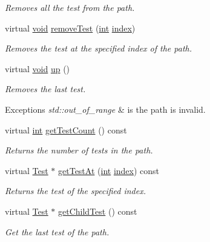 \begin{DoxyCompactItemize}
\begin{DoxyCompactList}\small\item\em Removes all the test from the path. \end{DoxyCompactList}\item 
virtual \hyperlink{wglew_8h_aeea6e3dfae3acf232096f57d2d57f084}{void} \hyperlink{class_test_path_afd1769a314ef84b6cbdd01af35009a0e}{remove\-Test} (\hyperlink{wglew_8h_a500a82aecba06f4550f6849b8099ca21}{int} \hyperlink{fmod__codec_8h_a57f14e05b1900f16a2da82ade47d0c6d}{index})
\begin{DoxyCompactList}\small\item\em Removes the test at the specified index of the path. \end{DoxyCompactList}\item 
virtual \hyperlink{wglew_8h_aeea6e3dfae3acf232096f57d2d57f084}{void} \hyperlink{class_test_path_a396e9d13b59f5e534582e80e3f1a2c42}{up} ()
\begin{DoxyCompactList}\small\item\em Removes the last test. 
\begin{DoxyExceptions}{Exceptions}
{\em std\-::out\-\_\-of\-\_\-range} & is the path is invalid. \\
\hline
\end{DoxyExceptions}
\end{DoxyCompactList}\item 
virtual \hyperlink{wglew_8h_a500a82aecba06f4550f6849b8099ca21}{int} \hyperlink{class_test_path_aab585e5b6dcc541fd92701173de5628b}{get\-Test\-Count} () const 
\begin{DoxyCompactList}\small\item\em Returns the number of tests in the path. \end{DoxyCompactList}\item 
virtual \hyperlink{class_test}{Test} $\ast$ \hyperlink{class_test_path_a320c9cb5c72b21b59f98fa4c956d0c0b}{get\-Test\-At} (\hyperlink{wglew_8h_a500a82aecba06f4550f6849b8099ca21}{int} \hyperlink{fmod__codec_8h_a57f14e05b1900f16a2da82ade47d0c6d}{index}) const 
\begin{DoxyCompactList}\small\item\em Returns the test of the specified index. \end{DoxyCompactList}\item 
virtual \hyperlink{class_test}{Test} $\ast$ \hyperlink{class_test_path_abd8fdd67607d785e26e844ee0b90366c}{get\-Child\-Test} () const 
\begin{DoxyCompactList}\small\item\em Get the last test of the path. \end{DoxyCompactList}\item 

\end{DoxyCompactItemize}
